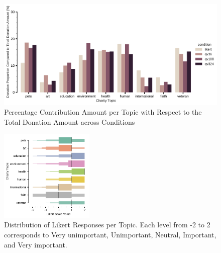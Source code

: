\begin{figure}[htpb]
    \centering
    \includegraphics[width=\textwidth, keepaspectratio=true]{content/image/normalized_contributions_per_topic_across_conditions.pdf}
    \caption{
      Percentage Contribution Amount per Topic with Respect to the Total Donation Amount across Conditions
    }
    \label{fig:topic_don_exp1}
\end{figure}

\begin{figure}[htpb]
    \centering
    \includegraphics[width=0.4\textwidth, keepaspectratio=true]{content/image/likert_distribution_per_topic.pdf}
    \caption{
      Distribution of Likert Responses per Topic. Each level from -2 to 2 corresponds to Very unimportant, Unimportant, Neutral, Important, and Very important.
    }
    \label{fig:likert_exp1}
\end{figure}



